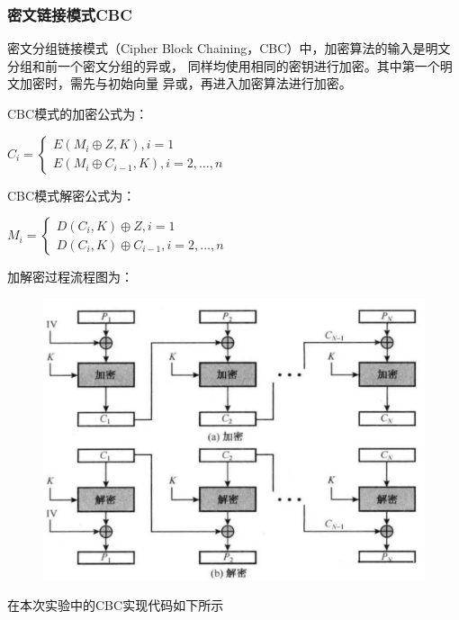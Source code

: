 \documentclass[a4paper,11pt,UTF8]{ctexart}
\newcommand{\bottomcaption}{%
\setlength{\abovecaptionskip}{6pt}%
\setlength{\belowcaptionskip}{6pt}%
\caption}
\newcommand{\xiaowuhao}{\fontsize{9pt}{\baselineskip}\selectfont}   %
\begin{document}
        \subsubsection{密文链接模式CBC}
            密文分组链接模式（Cipher Block Chaining，CBC）中，加密算法的输入是明文分组和前一个密文分组的异或，
            同样均使用相同的密钥进行加密。其中第一个明文加密时，需先与初始向量 异或，再进入加密算法进行加密。\par
            CBC模式的加密公式为：\par
            $C_{i}=\left\{\begin{matrix}E(M_{i}\oplus Z,K),i=1 \\E(M_{i}\oplus C_{i-1},K),i=2,\dots ,n\end{matrix}\right.$\par
            CBC模式解密公式为：\par
            $M_{i}=\left\{\begin{matrix}D(C_{i},K)\oplus Z,i=1 \\D(C_{i},K)\oplus C_{i-1},i=2,\dots ,n\end{matrix}\right. $\par
            加解密过程流程图为：
            \begin{figure}[H]
                \centering
                \includegraphics[width=13cm]{CBC.png}
                \bottomcaption{\xiaowuhao{CBC加解密流程}}
            \end{figure}
\newpage
            在本次实验中的CBC实现代码如下所示
            
\newpage
\end{document}
